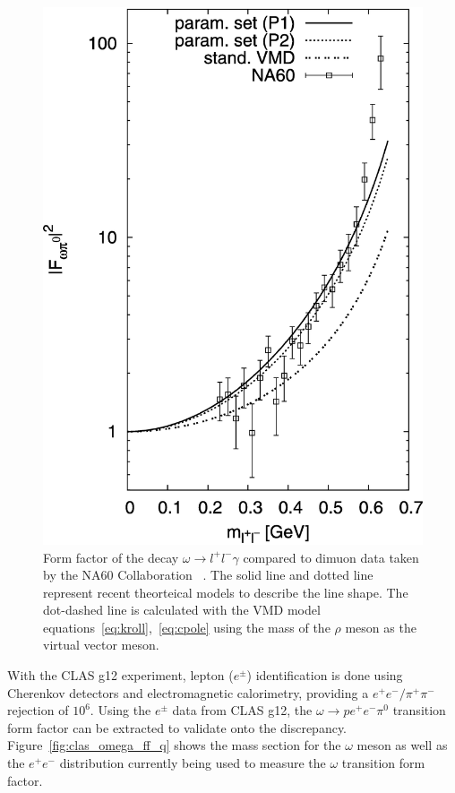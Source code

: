 \documentclass{aip-cp}
\begin{document}
 \begin{figure}[h!]
 	\centerline{\includegraphics[width=150 pt, height=150 pt]{figures/omega_ff.pdf}}
 	\caption{Form factor of the decay $\omega \to l^+l^- \gamma$ compared to dimuon data taken by the NA60 Collaboration ~\cite{bib5}. The solid line and dotted line represent recent theorteical models to describe the line shape. The dot-dashed line is calculated with the VMD model equations~\ref{eq:kroll},~\ref{eq:cpole} using the mass of the $\rho$ meson as the virtual vector meson.~\cite{bib6}}
 	\label{fig:omega_ff}
 \end{figure}
With the CLAS g12 experiment, lepton ($e^{\pm}$) identification is done using Cherenkov detectors and electromagnetic calorimetry, providing a $e^{+}e^{-}/\pi^{+}\pi^{-}$ rejection of $10^6$. Using the $e^{\pm}$ data from CLAS g12, the $ \omega \to p e^+ e^- \pi^0$ transition form factor can be extracted to validate onto the discrepancy. Figure~\ref{fig:clas_omega_ff_q} shows the mass section for the $\omega$ meson as well as the $e^+ e^-$ distribution currently being used to measure the $\omega$ transition form factor.  
\end{document}
